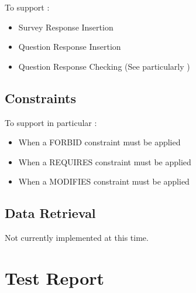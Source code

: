 \documentclass[10pt]{article}
\begin{document}
To support :

\begin{itemize}
\item Survey Response Insertion
\item Question Response Insertion
\item Question Response Checking (See particularly )
\end{itemize}

\subsection{Constraints}

To support in particular :

\begin{itemize}
\item When a FORBID constraint must be applied
\item When a REQUIRES constraint must be applied
\item When a MODIFIES constraint must be applied
\end{itemize}


\subsection{Data Retrieval}

Not currently implemented at this time.

\section{Test Report}


\end{document}
